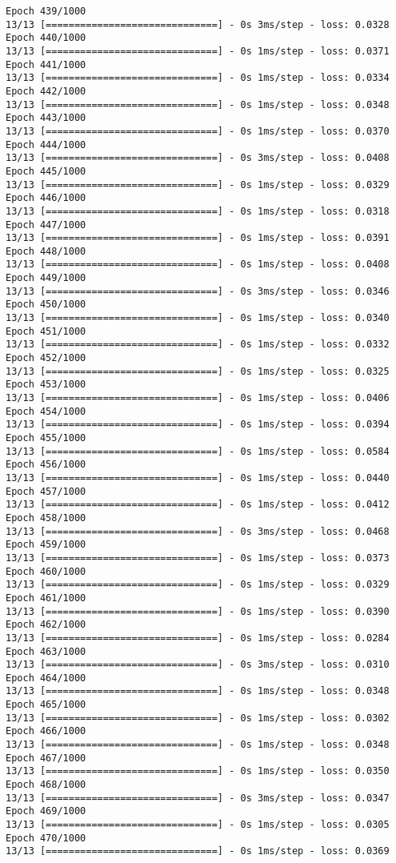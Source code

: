 \documentclass[11pt]{article}
\begin{document}
\begin{Verbatim}[commandchars=\\\{\}]
Epoch 439/1000
13/13 [==============================] - 0s 3ms/step - loss: 0.0328
Epoch 440/1000
13/13 [==============================] - 0s 1ms/step - loss: 0.0371
Epoch 441/1000
13/13 [==============================] - 0s 1ms/step - loss: 0.0334
Epoch 442/1000
13/13 [==============================] - 0s 1ms/step - loss: 0.0348
Epoch 443/1000
13/13 [==============================] - 0s 1ms/step - loss: 0.0370
Epoch 444/1000
13/13 [==============================] - 0s 3ms/step - loss: 0.0408
Epoch 445/1000
13/13 [==============================] - 0s 1ms/step - loss: 0.0329
Epoch 446/1000
13/13 [==============================] - 0s 1ms/step - loss: 0.0318
Epoch 447/1000
13/13 [==============================] - 0s 1ms/step - loss: 0.0391
Epoch 448/1000
13/13 [==============================] - 0s 1ms/step - loss: 0.0408
Epoch 449/1000
13/13 [==============================] - 0s 3ms/step - loss: 0.0346
Epoch 450/1000
13/13 [==============================] - 0s 1ms/step - loss: 0.0340
Epoch 451/1000
13/13 [==============================] - 0s 1ms/step - loss: 0.0332
Epoch 452/1000
13/13 [==============================] - 0s 1ms/step - loss: 0.0325
Epoch 453/1000
13/13 [==============================] - 0s 1ms/step - loss: 0.0406
Epoch 454/1000
13/13 [==============================] - 0s 1ms/step - loss: 0.0394
Epoch 455/1000
13/13 [==============================] - 0s 1ms/step - loss: 0.0584
Epoch 456/1000
13/13 [==============================] - 0s 1ms/step - loss: 0.0440
Epoch 457/1000
13/13 [==============================] - 0s 1ms/step - loss: 0.0412
Epoch 458/1000
13/13 [==============================] - 0s 3ms/step - loss: 0.0468
Epoch 459/1000
13/13 [==============================] - 0s 1ms/step - loss: 0.0373
Epoch 460/1000
13/13 [==============================] - 0s 1ms/step - loss: 0.0329
Epoch 461/1000
13/13 [==============================] - 0s 1ms/step - loss: 0.0390
Epoch 462/1000
13/13 [==============================] - 0s 1ms/step - loss: 0.0284
Epoch 463/1000
13/13 [==============================] - 0s 3ms/step - loss: 0.0310
Epoch 464/1000
13/13 [==============================] - 0s 1ms/step - loss: 0.0348
Epoch 465/1000
13/13 [==============================] - 0s 1ms/step - loss: 0.0302
Epoch 466/1000
13/13 [==============================] - 0s 1ms/step - loss: 0.0348
Epoch 467/1000
13/13 [==============================] - 0s 1ms/step - loss: 0.0350
Epoch 468/1000
13/13 [==============================] - 0s 3ms/step - loss: 0.0347
Epoch 469/1000
13/13 [==============================] - 0s 1ms/step - loss: 0.0305
Epoch 470/1000
13/13 [==============================] - 0s 1ms/step - loss: 0.0369

\end{Verbatim}
\end{document}
